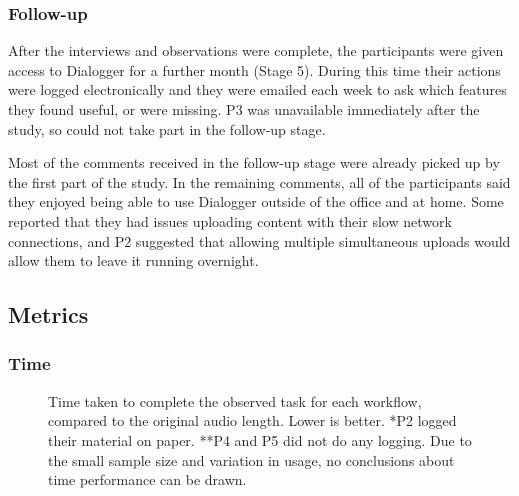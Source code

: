 

\subsubsection{Follow-up}\label{sec:followup}
After the interviews and observations were complete, the participants were given
access to Dialogger for a further month (Stage 5). During this time their
actions were logged electronically and they were emailed each week to ask which
features they found useful, or were missing. P3 was unavailable immediately
after the study, so could not take part in the follow-up stage.

Most of the comments received in the follow-up stage were already picked up by
the first part of the study. In the remaining comments, all of the participants
said they enjoyed being able to use Dialogger outside of the office
and at home. Some reported that they had issues uploading content with their
slow network connections, and P2 suggested that allowing multiple simultaneous
uploads would allow them to leave it running overnight.


\subsection{Metrics}\label{sec:resultsmetrics}
\subsubsection{Time}

\begin{figure}
\centering
  \caption{Time taken to complete the observed task for each workflow, compared to the original audio length. Lower is
    better. *P2 logged their material on paper. **P4 and P5 did not do any logging. Due to the small sample size and
    variation in usage, no conclusions about time performance can be drawn.}
  \label{fig:time} \end{figure}

